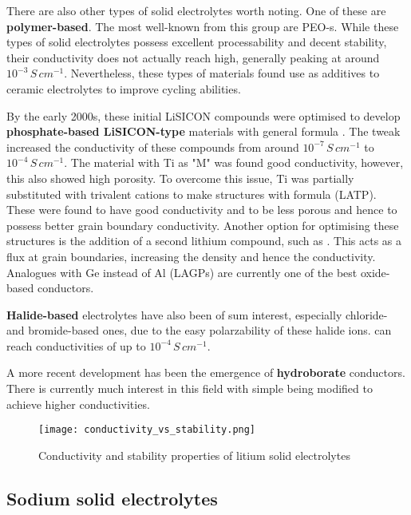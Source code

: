\documentclass[10pt,a4paper, titlepage]{article}
\begin{document}
There are also other types of solid electrolytes worth noting. One of these are \textbf{polymer-based}. The most well-known from this group are PEO-s. 
While these types of solid electrolytes possess excellent processability and decent stability, their conductivity does not actually reach high, generally peaking at around $10^{-3} \, S \, cm^{-1}$.
Nevertheless, these types of materials found use as additives to ceramic electrolytes to improve cycling abilities.

By the early 2000s, these initial LiSICON compounds were optimised to develop \textbf{phosphate-based LiSICON-type} materials with general formula . 
The tweak increased the conductivity of these compounds from around $10^{-7} \, S \, cm^{-1}$ to $10^{-4} \, S \, cm^{-1}$.
The material with Ti as "M" was found good conductivity, however, this also showed high porosity. \cite{RN19}
To overcome this issue, Ti was partially substituted with trivalent cations to make structures with formula  (LATP). 
These were found to have good conductivity and to be less porous and hence to possess better grain boundary conductivity. \cite{RN20}
Another option for optimising these structures is the addition of a second lithium compound, such as . 
This acts as a flux at grain boundaries, increasing the density and hence the conductivity. \cite{RN21}
Analogues with Ge instead of Al (LAGPs) are currently one of the best oxide-based conductors. \cite{RN3}

\textbf{Halide-based} electrolytes have also been of sum interest, especially chloride- and bromide-based ones, due to the easy polarzability of these halide ions.  can reach conductivities of up to $10^{-4} \, S \, cm^{-1}$.

A more recent development has been the emergence of \textbf{hydroborate} conductors. 
There is currently much interest in this field with simple  being modified to achieve higher conductivities.

\begin{figure}[h]
\centering
\texttt{[image: conductivity\_vs\_stability.png]}
\caption{\label{conductivity_vs_stability.jpg} Conductivity and stability properties of litium solid electrolytes \cite{RN85}}
\end{figure}

\subsection{Sodium solid electrolytes}
\end{document}
